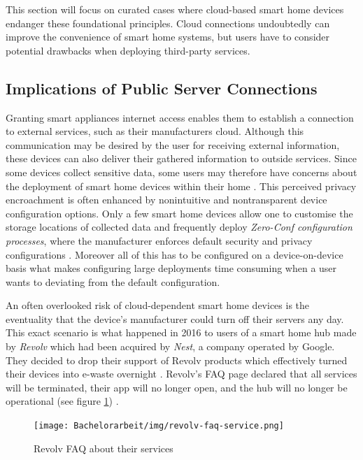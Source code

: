 
This section will focus on curated cases where cloud-based smart home devices endanger these foundational principles. Cloud connections undoubtedly can improve the convenience of smart home systems, but users have to consider potential drawbacks when deploying third-party services.

\subsection{Implications of Public Server Connections}
\label{sec:implications-server-connections}
Granting smart appliances internet access enables them to establish a connection to external services, such as their manufacturers cloud. Although this communication may be desired by the user for receiving external information, these devices can also deliver their gathered information to outside services. Since some devices collect sensitive data, some users may therefore have concerns about the deployment of smart home devices within their home \cite{ImprovingPrivacyControl-8514198}. This perceived privacy encroachment is often enhanced by nonintuitive and nontransparent device configuration options. Only a few smart home devices allow one to customise the storage locations of collected data and frequently deploy \textit{Zero-Conf configuration processes}, where the manufacturer enforces default security and privacy configurations \cite{ImprovingPrivacyControl-8514198}. Moreover all of this has to be configured on a device-on-device basis what makes configuring large deployments time consuming when a user wants to deviating from the default configuration.

An often overlooked risk of cloud-dependent smart home devices is the eventuality that the device's manufacturer could turn off their servers any day. This exact scenario is what happened in 2016 to users of a smart home hub made by \textit{Revolv} which had been acquired by \textit{Nest}, a company operated by Google. They decided to drop their support of Revolv products which effectively turned their devices into e-waste overnight \cite{Proctor2020BH}. Revolv's FAQ page declared that all services will be terminated, their app will no longer open, and the hub will no longer be operational (see figure \ref{fig:Revolv-FAQ-Services}) \cite{Gilbert2016Nest}.

\begin{figure}[H]
    \centering
    \texttt{[image: Bachelorarbeit/img/revolv-faq-service.png]}
    \caption{Revolv FAQ about their services \cite{Gilbert2016Nest}}
    \label{fig:Revolv-FAQ-Services}
\end{figure}

